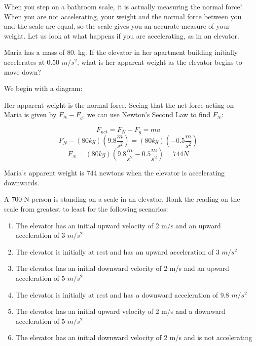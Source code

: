 When you step on a bathroom scale, it is actually measuring the normal force! 
When you are not accelerating, your weight and the normal force between you and 
the scale are equal, so the scale gives you an accurate measure of your weight. 
Let us look at what happens if you are accelerating, as in an elevator.

\begin{Worked}
\begin{Problem}
Maria has a mass of 80. kg. If the elevator in her apartment 
building initially accelerates at 0.50 $m/s^2$, what is her apparent weight as 
the elevator begins to move down?
\end{Problem}
\begin{Solution}
We begin with a diagram:
\begin{center}
\end{center}

Her apparent weight is the normal force. Seeing that the net force acting on 
Maria is given by $F_N - F_g$, we can use Newton's Second Law to find $F_N$:

$$F_{net} = F_N - F_g = ma$$
$$F_N - \left( 80 kg \right) \left(9.8 \frac{m}{s^2} \right) = \left( 80 kg 
\right) \left( -0.5 \frac{m}{s^2} \right)$$
$$F_N = \left( 80 kg \right) \left( 9.8 \frac{m}{s^2} - 0.5 \frac{m}{s^2} 
\right) = 744 N$$

Maria's apparent weight is 744 newtons when the elevator is accelerating 
downwards. 
\end{Solution}
\end{Worked}

\begin{Exercise}[title = Moving Elevators, label = elevator]
A 700-N person is standing on a scale in an elevator. Rank the reading on the 
scale from greatest to least for the following scenarios:
\begin{enumerate}
\item The elevator has an initial upward velocity of 2 m/s and an upward 
acceleration of 3 $m/s^2$
\item The elevator is initially at rest and has an upward acceleration of 3 
$m/s^2$
\item The elevator has an initial downward velocity of 2 m/s and an upward 
acceleration of 5 $m/s^2$
\item The elevator is initially at rest and has a downward acceleration of 
9.8 $m/s^2$
\item The elevator has an initial upward velocity of 2 m/s and a downward 
acceleration of 5 $m/s^2$
\item The elevator has an initial downward velocity of 2 m/s and is not 
accelerating 
\end{enumerate}
\end{Exercise}

